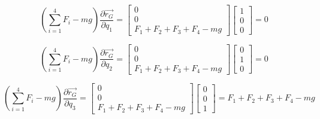 \documentclass{article}
\begin{document}
\begin{equation}
(\sum_{i=1}^{4}F_{i} - mg)\frac{\partial\overrightarrow{r_{G}}}{\partial q_{1}} =\left[\begin{array}{c} 0 \\ 0 \\ F_{1} + F_{2} + F_{3} + F_{4} -mg\end{array}\right]\left[\begin{array}{c} 1 \\ 0 \\ 0\end{array}\right] = 0
\end{equation}

\begin{equation}
(\sum_{i=1}^{4}F_{i} - mg)\frac{\partial\overrightarrow{r_{G}}}{\partial q_{2}} =\left[\begin{array}{c} 0 \\ 0 \\ F_{1} + F_{2} + F_{3} + F_{4} -mg\end{array}\right]\left[\begin{array}{c} 0 \\ 1 \\ 0\end{array}\right] = 0
\end{equation}

\begin{equation}
(\sum_{i=1}^{4}F_{i} - mg)\frac{\partial\overrightarrow{r_{G}}}{\partial q_{3}} =\left[\begin{array}{c} 0 \\ 0 \\ F_{1} + F_{2} + F_{3} + F_{4} -mg\end{array}\right]\left[\begin{array}{c} 0 \\ 0 \\ 1\end{array}\right] = F_{1} + F_{2} + F_{3} + F_{4} -mg
\end{equation}

\end{document}
